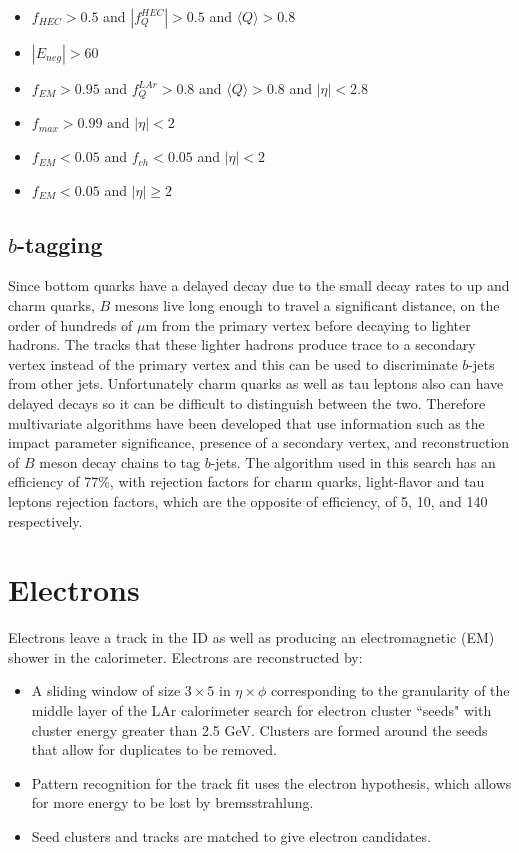 \begin{itemize}
	\item $f_{HEC}>0.5$ and $|f_{Q}^{HEC}|>0.5$ and $\langle Q \rangle > 0.8$ 
	\item $|E_{neg}|>60$ 
	\item $f_{EM}>0.95$ and $f_{Q}^{LAr}>0.8$ and $\langle Q \rangle > 0.8$ and $|\eta|<2.8$
	\item $f_{max}>0.99$ and $|\eta|<2$  
	\item $f_{EM}<0.05$ and $f_{ch}<0.05$ and $|\eta|<2$
	\item $f_{EM}<0.05$ and $|\eta|\geq2$
\end{itemize}


\subsection{$b$-tagging}
\label{sec:btag}

Since bottom quarks have a delayed decay due to the small decay rates to up and charm quarks, $B$ mesons live long enough to travel a significant distance, on the order of hundreds of $\mu$m from the primary vertex before decaying to lighter hadrons.  The tracks that these lighter hadrons produce trace to a secondary vertex instead of the primary vertex and this can be used to discriminate $b$-jets from other jets.  Unfortunately charm quarks as well as tau leptons also can have delayed decays so it can be difficult to distinguish between the two.  Therefore multivariate algorithms have been developed\cite{btagging} that use information such as the impact parameter significance, presence of a secondary vertex, and reconstruction of $B$ meson decay chains to tag $b$-jets.  The algorithm used in this search has an efficiency of 77\%, with rejection factors for charm quarks, light-flavor and tau leptons rejection factors, which are the opposite of efficiency, of 5, 10, and 140 respectively.  \\

\section{Electrons}
\label{sec:elec}

Electrons leave a track in the ID as well as producing an electromagnetic (EM) shower in the calorimeter.  Electrons are reconstructed by\cite{ATLAS-CONF-2016-024}:

\begin{itemize}
	\item A sliding window of size $3 \times 5$ in $\eta \times \phi$ corresponding to the granularity of the middle layer of the LAr calorimeter search for electron cluster ``seeds" with cluster energy greater than 2.5 GeV.  Clusters are formed around the seeds that allow for duplicates to be removed.
	\item Pattern recognition for the track fit uses the electron hypothesis, which allows for more energy to be lost by bremsstrahlung.  
	\item Seed clusters and tracks are matched to give electron candidates.  
\end{itemize}

